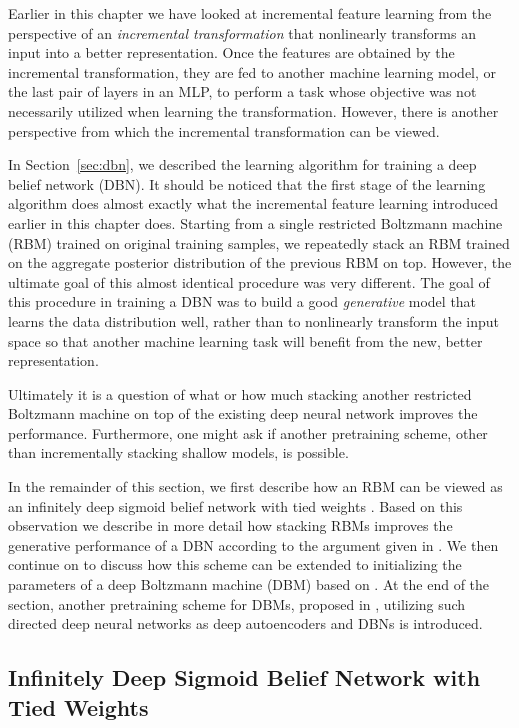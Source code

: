 \documentclass[dissertation,nocontribution]{aaltoseries}
\begin{document}
Earlier in this chapter we have looked at incremental
feature learning from the perspective of an \textit{incremental
transformation} that nonlinearly transforms an input into a
better representation. Once the features are obtained by
the incremental transformation, they are fed to another
machine learning model, or the last pair of layers in an
MLP, to perform a task whose objective was not necessarily
utilized when learning the transformation. However, there is
another perspective from which the incremental
transformation can be viewed.

In Section~\ref{sec:dbn}, we described the learning
algorithm for training a deep belief network (DBN). 
It should be noticed that the first stage of the learning
algorithm does almost exactly what the incremental feature
learning introduced earlier in this chapter does. Starting
from a single restricted Boltzmann machine (RBM) trained on
original training samples, we repeatedly stack an RBM
trained on the aggregate posterior distribution of the
previous RBM on top.  However, the ultimate goal of this
almost identical procedure was very different.  The goal of
this procedure in training a DBN was to build a good
\textit{generative} model that learns the data distribution
well, rather than to nonlinearly transform the input space
so that another machine learning task will benefit from the
new, better representation.

Ultimately it is a question of what or how much
stacking another restricted Boltzmann machine on top of the
existing deep neural network improves the performance.
Furthermore, one might ask if another pretraining scheme,
other than incrementally stacking shallow models, is
possible.

In the remainder of this section, we first describe how an
RBM can be viewed as an infinitely deep sigmoid belief
network with tied weights \citep{Hinton2006nc}. Based on
this observation we describe in more detail how stacking
RBMs improves the generative performance of a DBN according
to the argument given in
\citep{Hinton2006nc,Salakhutdinov2012nc}.  We then continue
on to discuss how this scheme can be extended to
initializing the parameters of a deep Boltzmann machine
(DBM) based on
\citep{Salakhutdinov2012nc,Salakhutdinov2012}. At the end of
the section, another pretraining scheme for DBMs, proposed in
, utilizing such directed deep neural
networks as deep autoencoders and DBNs is introduced.


\subsection{Infinitely Deep Sigmoid Belief Network with
Tied Weights}
\label{sec:inf_sbn_rbm}
\end{document}

